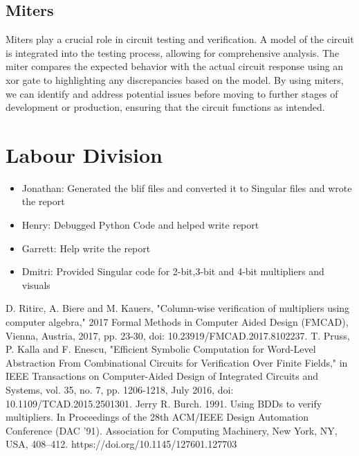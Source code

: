 \documentclass[conference]{IEEEtran}
\begin{document}
\subsection{Miters}
Miters play a crucial role in circuit testing and verification. A model of the circuit is integrated into 
the testing process, allowing for comprehensive analysis. The miter compares the expected behavior with 
the actual circuit response using an xor gate to highlighting any discrepancies based on the model. 
By using miters, we can identify and address potential issues before moving to further stages of development 
or production, ensuring that the circuit functions as intended.  

\section{Labour Division}
\begin{itemize}
    \item Jonathan: Generated the blif files and converted it to Singular files and wrote the report
    \item Henry: Debugged Python Code and helped write report
    \item Garrett: Help write the report
    \item Dmitri: Provided Singular code for 2-bit,3-bit and 4-bit multipliers and visuals
\end{itemize}

\begin{thebibliography}{03}
 D. Ritirc, A. Biere and M. Kauers, "Column-wise verification of multipliers using computer algebra," 2017 Formal Methods in Computer Aided Design (FMCAD), Vienna, Austria, 2017, pp. 23-30, doi: 10.23919/FMCAD.2017.8102237.
 T. Pruss, P. Kalla and F. Enescu, "Efficient Symbolic Computation for Word-Level Abstraction From Combinational Circuits for Verification Over Finite Fields," in IEEE Transactions on Computer-Aided Design of Integrated Circuits and Systems, vol. 35, no. 7, pp. 1206-1218, July 2016, doi: 10.1109/TCAD.2015.2501301.
 Jerry R. Burch. 1991. Using BDDs to verify multipliers. In Proceedings of the 28th ACM/IEEE Design Automation Conference (DAC '91). Association for Computing Machinery, New York, NY, USA, 408–412. https://doi.org/10.1145/127601.127703
\end{thebibliography}
\vspace{12pt}
\end{document}
